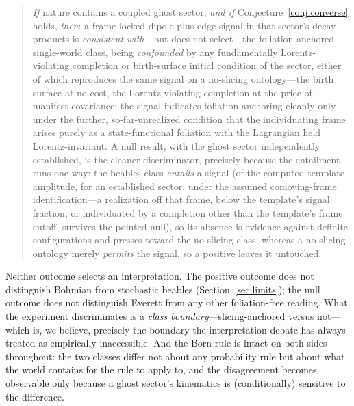 \documentclass[11pt]{article}
\theoremstyle{remark}
\begin{document}
\begin{quote}
\emph{If} nature contains a coupled ghost sector, \emph{and if}
Conjecture~\ref{conj:converse} holds, \emph{then}: a frame-locked
dipole-plus-edge signal in that sector's decay products is
\emph{consistent with}---but does not select---the foliation-anchored
single-world class, being \emph{confounded} by any fundamentally
Lorentz-violating completion or
birth-surface initial condition of the sector, either of which
reproduces the same signal on a no-slicing ontology---the birth surface
at no cost, the Lorentz-violating completion at the price of manifest
covariance; the
signal indicates foliation-anchoring cleanly only under the further,
so-far-unrealized condition that the individuating frame arises purely
as a state-functional foliation with the Lagrangian held
Lorentz-invariant. A null result, with the ghost sector independently
established, is the cleaner discriminator, precisely because the
entailment runs one way: the beables class \emph{entails} a signal (of
the computed template amplitude, for an established sector, under the
assumed comoving-frame identification---a realization off that frame,
below the template's signal fraction, or individuated by a completion
other than the template's frame cutoff, survives the pointed null),
so its absence is evidence against definite configurations and presses
toward the no-slicing class, whereas a no-slicing ontology merely
\emph{permits} the signal, so a positive leaves it untouched.
\end{quote}

Neither outcome selects an interpretation. The positive outcome does
not distinguish Bohmian from stochastic beables
(Section~\ref{sec:limits}); the null outcome does not distinguish
Everett from any other foliation-free reading. What the experiment
discriminates is a \emph{class boundary}---slicing-anchored versus
not---which is, we believe, precisely the boundary the interpretation
debate has always treated as empirically inaccessible. And the Born
rule is intact on both sides throughout: the two classes differ not
about any probability rule but about what the world contains for the
rule to apply to, and the disagreement becomes observable only
because a ghost sector's kinematics is (conditionally) sensitive to
the difference.
\end{document}
